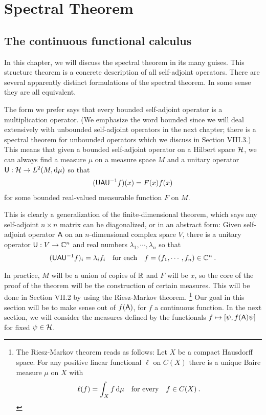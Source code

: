 \setcounter{section}{6}

\section{Spectral Theorem}

\subsection{The continuous functional calculus}

In this chapter, we will discuss the spectral theorem in its many guises. This structure theorem is a concrete description of all self-adjoint operators. There are several apparently distinct formulations of the spectral theorem. In some sense they are all equivalent.

The form we prefer says that every bounded self-adjoint operator is a multiplication operator. (We emphasize the word bounded since we will deal extensively with unbounded self-adjoint operators in the next chapter; there is a spectral theorem for unbounded operators which we discuss in Section VIII.3.) This means that given a bounded self-adjoint operator on a Hilbert space $\mathcal{H}$, we can always find a measure $\mu$ on a measure space $M$ and a unitary operator $\mathsf{U}: \mathcal{H} \to L^{2}(M, \mathrm{d} \mu)$ so that
\begin{align}
    (\mathsf{U} \mathsf{A} \mathsf{U}^{-1} f)(x) = F(x)f(x)
\end{align}
for some bounded real-valued measurable function $F$ on $M$.

This is clearly a generalization of the finite-dimensional theorem, which says any self-adjoint $n \times n$ matrix can be diagonalized, or in an abstract form: Given self-adjoint operator $\mathsf{A}$ on an $n$-dimensional complex space $V$,
there is a unitary operator $\mathsf{U}: V \to \mathbb{C}^n$ and real numbers $\lambda_1, \cdots, \lambda_n$ so that \begin{align}
    (\mathsf{U} \mathsf{A} \mathsf{U}^{-1} f)_i = \lambda_i f_i \quad \text{for each} \quad f = (f_1, \cdots, f_n) \in \mathbb{C}^n \:.
\end{align}

In practice, $M$ will be a union of copies of $\mathbb{R}$ and $F$ will be $x$, so the core of the proof of the theorem will be the construction of certain measures.
This will be done in Section VII.2 by using the Riesz-Markov theorem.
\footnote{
    The Riesz-Markov theorem reads as follows: Let $X$ be a compact Hausdorff space. For any positive linear functional $\ell$ on $C(X)$ there is a unique Baire measure $\mu$ on $X$ with 
\begin{align*} 
    \ell(f) = \int_X f \, \mathrm{d} \mu \quad \text{for every} \quad f \in C(X) \:.
\end{align*}
}
 Our goal in this section will be to make sense out of $f(\mathsf{A})$, for $f$ a continuous function. In the next section, we will consider the measures defined by the functionals $f \mapsto [\psi, f(\mathsf{A}) \psi]$ for fixed $\psi \in \mathcal{H}$.

